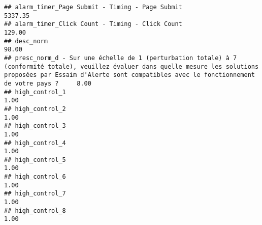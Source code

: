 \documentclass[
]{article}
\begin{document}
\begin{verbatim}
## alarm_timer_Page Submit - Timing - Page Submit                                                                                                                                                                              5337.35
## alarm_timer_Click Count - Timing - Click Count                                                                                                                                                                               129.00
## desc_norm                                                                                                                                                                                                                     98.00
## presc_norm_d - Sur une échelle de 1 (perturbation totale) à 7 (conformité totale), veuillez évaluer dans quelle mesure les solutions proposées par Essaim d'Alerte sont compatibles avec le fonctionnement de votre pays ?     8.00
## high_control_1                                                                                                                                                                                                                 1.00
## high_control_2                                                                                                                                                                                                                 1.00
## high_control_3                                                                                                                                                                                                                 1.00
## high_control_4                                                                                                                                                                                                                 1.00
## high_control_5                                                                                                                                                                                                                 1.00
## high_control_6                                                                                                                                                                                                                 1.00
## high_control_7                                                                                                                                                                                                                 1.00
## high_control_8                                                                                                                                                                                                                 1.00

\end{verbatim}
\end{document}
